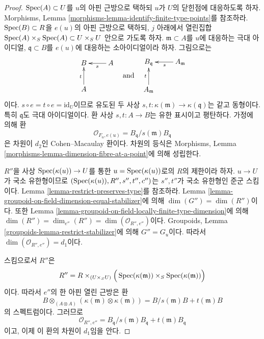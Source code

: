 \begin{proof}
$\mathop{\mathrm{Spec}}(A) \subset U$를 $u$의 아핀 근방으로 택하되 $u$가 $U$의 닫힌점에
대응하도록 하자. Morphisms, Lemma
\ref{morphisms-lemma-identify-finite-type-points}를 참조하라.
$\mathop{\mathrm{Spec}}(B) \subset R$을 $e(u)$의 아핀 근방으로 택하되, $j$ 아래에서 열린집합
$\mathop{\mathrm{Spec}}(A) \times_S \mathop{\mathrm{Spec}}(A) \subset U \times_S U$ 안으로 가도록 하자.
$\mathfrak m \subset A$를 $u$에 대응하는 극대 아이디얼,
$\mathfrak q \subset B$를 $e(u)$에 대응하는 소아이디얼이라 하자. 그림으로는
$$
\vcenter{
\xymatrix{
B & A \ar[l]^s \\
A \ar[u]^t
}
}
\quad\text{and}\quad
\vcenter{
\xymatrix{
B_{\mathfrak q} & A_{\mathfrak m} \ar[l]^s \\
A_{\mathfrak m} \ar[u]^t
}
}
$$
이다. $s \circ e = t \circ e = \text{id}_U$이므로 유도된 두 사상
$s, t : \kappa(\mathfrak m) \to \kappa(\mathfrak q)$는 같고 동형이다.
특히 $\mathfrak q$도 극대 아이디얼이다. 환 사상 $s, t : A \to B$는
유한 표시이고 평탄하다. 가정에 의해 환
$$
\mathcal{O}_{F_u, e(u)} = B_{\mathfrak q}/s(\mathfrak m)B_{\mathfrak q}
$$
은 차원이 $d_2$인 Cohen--Macaulay 환이다. 차원의 등식은 Morphisms, Lemma
\ref{morphisms-lemma-dimension-fibre-at-a-point}에 의해 성립한다.

\medskip\noindent
$R''$을 사상 $\mathop{\mathrm{Spec}}(\kappa(u)) \to U$를 통한
$u = \mathop{\mathrm{Spec}}(\kappa(u))$로의 $R$의 제한이라 하자. $u \to U$가 국소 유한형이므로
$(\mathop{\mathrm{Spec}}(\kappa(u)), R'', s'', t'', c'')$는 $s'', t''$가 국소 유한형인
준군 스킴이다. Lemma \ref{lemma-restrict-preserves-type}를 참조하라.
Lemma \ref{lemma-groupoid-on-field-dimension-equal-stabilizer}에 의해
$\dim(G'') = \dim(R'')$이다. 또한 Lemma
\ref{lemma-groupoid-on-field-locally-finite-type-dimension}에 의해
$\dim(R'') = \dim_{e''}(R'') = \dim(\mathcal{O}_{R'', e''})$이다.
Groupoids, Lemma \ref{groupoids-lemma-restrict-stabilizer}에 의해
$G'' = G_u$이다. 따라서 $\dim(\mathcal{O}_{R'', e''}) = d_1$이다.

\medskip\noindent
스킴으로서 $R''$은
$$
R'' =
R \times_{(U \times_S U)}
\Big(
\mathop{\mathrm{Spec}}(\kappa(\mathfrak m)) \times_S \mathop{\mathrm{Spec}}(\kappa(\mathfrak m))
\Big)
$$
이다. 따라서 $e''$의 한 아핀 열린 근방은 환
$$
B \otimes_{(A \otimes A)} (\kappa(\mathfrak m) \otimes \kappa(\mathfrak m))
=
B/s(\mathfrak m)B + t(\mathfrak m)B
$$
의 스펙트럼이다. 그러므로
$$
\mathcal{O}_{R'', e''} =
B_{\mathfrak q}/s(\mathfrak m)B_{\mathfrak q} + t(\mathfrak m)B_{\mathfrak q}
$$
이고, 이제 이 환의 차원이 $d_1$임을 안다.


\end{proof}
